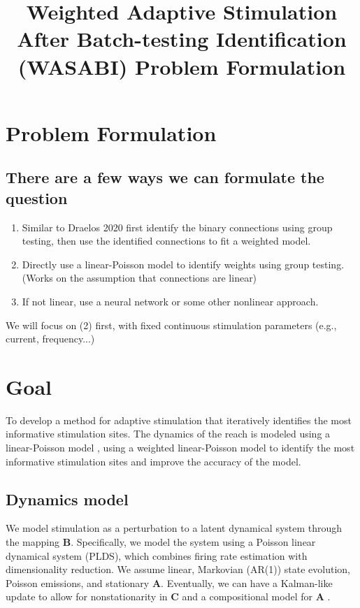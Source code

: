 \documentclass[11pt,letterpaper]{article} %
\title{\vspace{-2.5cm} Weighted Adaptive Stimulation After Batch-testing Identification (WASABI) Problem Formulation \\
  \large  \vspace{-0.4cm}}
\author{}%
\date{\vspace{-0.5cm}}
\begin{document}
\maketitle
\vspace{-1cm}
\section*{Problem Formulation}
\subsection*{There are a few ways we can formulate the question}
\begin{enumerate}[itemsep=0em, topsep=0.2em]
    \item Similar to Draelos 2020 first identify the binary connections using group testing, then use the identified connections to fit a weighted model.
    \item Directly use a linear-Poisson model to identify weights using group testing. (Works on the assumption that connections are linear)
    \item If not linear, use a neural network or some other nonlinear approach.
\end{enumerate}
We will focus on (2) first, with fixed continuous stimulation parameters (e.g., current, frequency...)

\section*{Goal}
To develop a method for adaptive stimulation that iteratively identifies the most informative stimulation sites. The dynamics of the reach is modeled using a linear-Poisson model , using a weighted linear-Poisson model to identify the most informative stimulation sites and improve the accuracy of the model.

\subsection*{Dynamics model}
We model stimulation as a perturbation to a latent dynamical system through the mapping $\bm{B}$. Specifically, we model the system using a Poisson linear dynamical system (PLDS), which combines firing rate estimation with dimensionality reduction. We assume linear, Markovian (AR(1)) state evolution, Poisson emissions, and stationary $\bm{A}$. Eventually, we can have a Kalman-like update to allow for nonstationarity in $\bm{C}$\label{sec:nonstationarity} and a compositional model for $\bm{A}$
\label{sec:compositional_model}.
\end{document}
